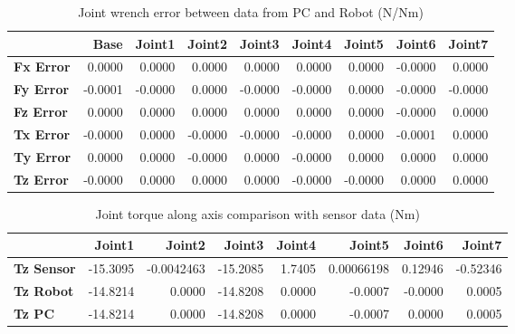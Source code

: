 \begin{table}[h!]
	\centering
	\caption{Joint wrench error between data from PC and Robot (N/Nm)}
	\label{wrech_Error_Pose14}
	\begin{tabular}{|l|r|r|r|r|r|r|r|r|}
		\hline
		\textbf{}  & \textbf{Base} & \textbf{Joint1}  & \textbf{Joint2}  & \textbf{Joint3}  & \textbf{Joint4}  & \textbf{Joint5}  & \textbf{Joint6}  & \textbf{Joint7} \\ \hline
		\textbf{Fx Error}  & 0.0000        & 0.0000        & 0.0000        & 0.0000        & 0.0000        & 0.0000        & -0.0000        & 0.0000 \\ \hline
		\textbf{Fy Error}  & -0.0001        & -0.0000        & 0.0000        & -0.0000        & -0.0000        & 0.0000        & -0.0000        & -0.0000 \\ \hline
		\textbf{Fz Error}  & 0.0000        & 0.0000        & 0.0000        & 0.0000        & 0.0000        & 0.0000        & -0.0000        & 0.0000 \\ \hline
		\textbf{Tx Error}  & -0.0000        & 0.0000        & -0.0000        & -0.0000        & -0.0000        & 0.0000        & -0.0001        & 0.0000 \\ \hline
		\textbf{Ty Error}  & 0.0000        & 0.0000        & -0.0000        & 0.0000        & -0.0000        & 0.0000        & 0.0000        & 0.0000 \\ \hline
		\textbf{Tz Error}  & -0.0000        & 0.0000        & 0.0000        & 0.0000        & -0.0000        & -0.0000        & 0.0000        & 0.0000 \\ \hline
	\end{tabular}
\end{table}

\begin{table}[h!]
	\centering
	\caption{Joint torque along axis comparison with sensor data (Nm)}
	\label{wrech_Sensor_Pose14}
	\begin{tabular}{|l|r|r|r|r|r|r|r|}
		\hline
		\textbf{} & \textbf{Joint1} & \textbf{Joint2} & \textbf{Joint3} & \textbf{Joint4} & \textbf{Joint5} & \textbf{Joint6} & \textbf{Joint7} \\ \hline
		\textbf{Tz Sensor}  & -15.3095           & -0.0042463           & -15.2085            & 1.7405           & 0.00066198           & 0.12946           & -0.52346           \\ \hline
		\textbf{Tz Robot}  	& -14.8214           & 0.0000           & -14.8208            & 0.0000           & -0.0007           & -0.0000           & 0.0005           \\ \hline
		\textbf{Tz PC}  	& -14.8214           & 0.0000           & -14.8208            & 0.0000           & -0.0007           & 0.0000           & 0.0005           \\ \hline
	\end{tabular}
\end{table}

